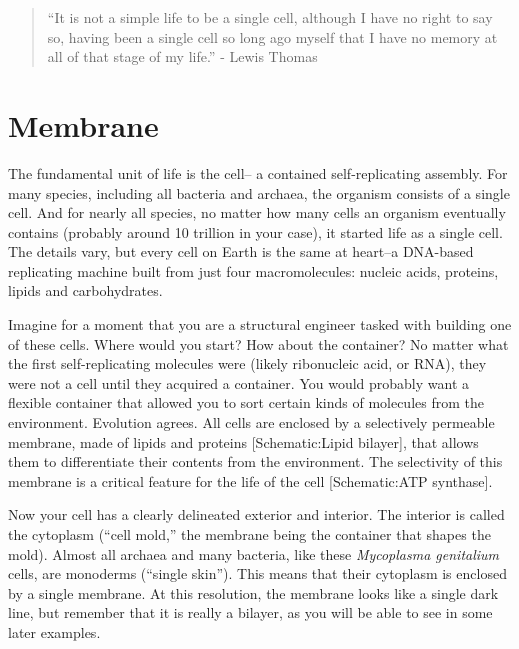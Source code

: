 \documentclass[]{tufte-book}
\begin{document}
\begin{quote}
``It is not a simple life to be a single cell, although I have no right to say so, having been a single cell so long ago myself that I have no memory at all of that stage of my life.''
- Lewis Thomas \citep{thomas1990}
\end{quote}

\hypertarget{membrane}{%
\section{Membrane}\label{membrane}}

The fundamental unit of life is the cell-- a contained self-replicating assembly. For many species, including all bacteria and archaea, the organism consists of a single cell. And for nearly all species, no matter how many cells an organism eventually contains (probably around 10 trillion in your case), it started life as a single cell. The details vary, but every cell on Earth is the same at heart--a DNA-based replicating machine built from just four macromolecules: nucleic acids, proteins, lipids and carbohydrates.

Imagine for a moment that you are a structural engineer tasked with building one of these cells. Where would you start? How about the container? No matter what the first self-replicating molecules were (likely ribonucleic acid, or RNA), they were not a cell until they acquired a container. You would probably want a flexible container that allowed you to sort certain kinds of molecules from the environment. Evolution agrees. All cells are enclosed by a selectively permeable membrane, made of lipids and proteins {[}Schematic:Lipid bilayer{]}, that allows them to differentiate their contents from the environment. The selectivity of this membrane is a critical feature for the life of the cell {[}Schematic:ATP synthase{]}.

Now your cell has a clearly delineated exterior and interior. The interior is called the cytoplasm (``cell mold,'' the membrane being the container that shapes the mold). Almost all archaea and many bacteria, like these \emph{Mycoplasma genitalium} cells, are monoderms (``single skin''). This means that their cytoplasm is enclosed by a single membrane. At this resolution, the membrane looks like a single dark line, but remember that it is really a bilayer, as you will be able to see in some later examples.



\hypertarget{htmlwidget-e3a7bbf18c83cde0c5cf}{}
\end{document}
